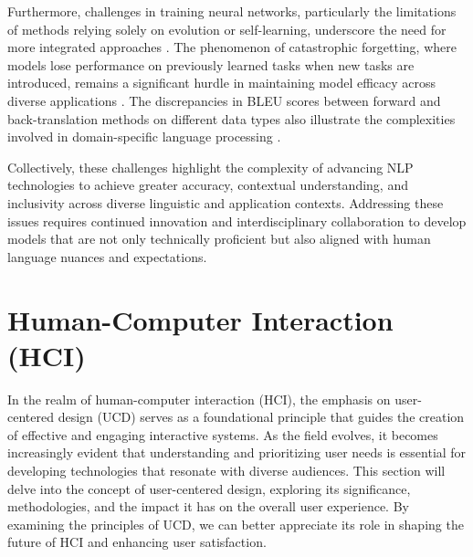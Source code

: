 Furthermore, challenges in training neural networks, particularly the limitations of methods relying solely on evolution or self-learning, underscore the need for more integrated approaches \cite{le2019evolvingselfsupervisedneuralnetworks}. The phenomenon of catastrophic forgetting, where models lose performance on previously learned tasks when new tasks are introduced, remains a significant hurdle in maintaining model efficacy across diverse applications \cite{chitale2023taskarithmeticloracontinual}. The discrepancies in BLEU scores between forward and back-translation methods on different data types also illustrate the complexities involved in domain-specific language processing \cite{bogoychev2020domaintranslationesenoisesynthetic}.



Collectively, these challenges highlight the complexity of advancing NLP technologies to achieve greater accuracy, contextual understanding, and inclusivity across diverse linguistic and application contexts. Addressing these issues requires continued innovation and interdisciplinary collaboration to develop models that are not only technically proficient but also aligned with human language nuances and expectations.













\section{Human-Computer Interaction (HCI)} \label{sec:Human-Computer Interaction (HCI)}

In the realm of human-computer interaction (HCI), the emphasis on user-centered design (UCD) serves as a foundational principle that guides the creation of effective and engaging interactive systems. As the field evolves, it becomes increasingly evident that understanding and prioritizing user needs is essential for developing technologies that resonate with diverse audiences. This section will delve into the concept of user-centered design, exploring its significance, methodologies, and the impact it has on the overall user experience. By examining the principles of UCD, we can better appreciate its role in shaping the future of HCI and enhancing user satisfaction.






